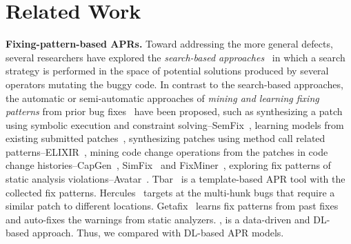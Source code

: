 \section{Related Work}
\label{related:sec}


{\bf Fixing-pattern-based APRs.} 
%
Toward addressing the more general defects, several researchers have
explored the {\em search-based
  approaches}~\cite{le2011genprog,qi2014strength,LeGoues-icse12,martinez2016astor}
in which a search strategy is performed in the space of potential
solutions produced by several operators mutating the buggy code. In
contrast to the search-based approaches, the automatic or
semi-automatic approaches of {\em mining and learning fixing patterns}
from prior bug fixes~\cite{le2016history,
  kim2013automatic,nguyen2013semfix,liu2019avatar,tbar-issta19} have
been proposed, such as synthesizing a patch using symbolic execution
and constraint solving--SemFix~\cite{nguyen2013semfix}, learning
models from existing submitted
patches~\cite{long2016automatic,long2017automatic,le2016history},
synthesizing patches using method call related
patterns--ELIXIR~\cite{saha2017elixir}, mining code change operations
from the patches in code change
histories--CapGen~\cite{wen2018context}, SimFix~\cite{Simfix} and
FixMiner~\cite{koyuncu2018fixminer}, exploring fix patterns of static
analysis
violations--Avatar~\cite{liu2019avatar}. Tbar~\cite{tbar-issta19} is a
template-based APR tool with the collected fix patterns.
Hercules~\cite{10.1109/ICSE.2019.00020} targets at the multi-hunk bugs
that require a similar patch to different
locations. Getafix~\cite{bader2019getafix} learns fix patterns from
past fixes and auto-fixes the warnings from static analyzers. {\tool},
is a data-driven and DL-based approach. Thus, we compared {\tool} with
DL-based APR models.





